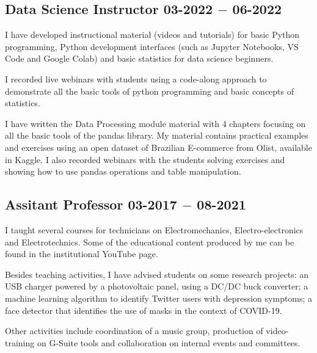 \subsection{{Data Science Instructor \hfill 03-2022 $-$ 06-2022}}
\begin{zitemize}
\item I have developed instructional material (videos and tutorials) for basic Python programming, Python development interfaces (such as Jupyter Notebooks, VS Code and Google Colab) and basic statistics for data science beginners.
\item I recorded live webinars with students using a code-along approach to demonstrate all the basic tools of python programming and basic concepts of statistics.
\item I have written the Data Processing module material with 4 chapters focusing on all the basic tools of the pandas library. My material contains practical examples and exercises using an open dataset of Brazilian E-commerce from Olist, available in Kaggle. I also recorded webinars with the students solving exercises and showing how to use pandas operations and table manipulation.
\end{zitemize}

\subsection{{Assitant Professor \hfill 03-2017 $-$ 08-2021}}
\begin{zitemize}
\item I taught several courses for technicians on Electromechanics, Electro-electronics and Electrotechnics. Some of the educational content produced by me can be found in the institutional YouTube page. 
\item Besides teaching activities, I have advised students on some research projects: an USB charger powered by a photovoltaic panel, using a DC/DC buck converter; a machine learning algorithm to identify Twitter users with depression symptoms; a face detector that identifies the use of masks in the context of COVID-19.
\item Other activities include coordination of a music group, production of video-training on G-Suite tools and collaboration on internal events and committees.
\end{zitemize}

